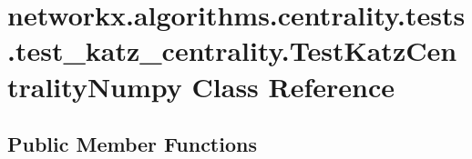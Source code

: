 \hypertarget{classnetworkx_1_1algorithms_1_1centrality_1_1tests_1_1test__katz__centrality_1_1TestKatzCentralityNumpy}{}\section{networkx.\+algorithms.\+centrality.\+tests.\+test\+\_\+katz\+\_\+centrality.\+Test\+Katz\+Centrality\+Numpy Class Reference}
\label{classnetworkx_1_1algorithms_1_1centrality_1_1tests_1_1test__katz__centrality_1_1TestKatzCentralityNumpy}
\subsection*{Public Member Functions}
